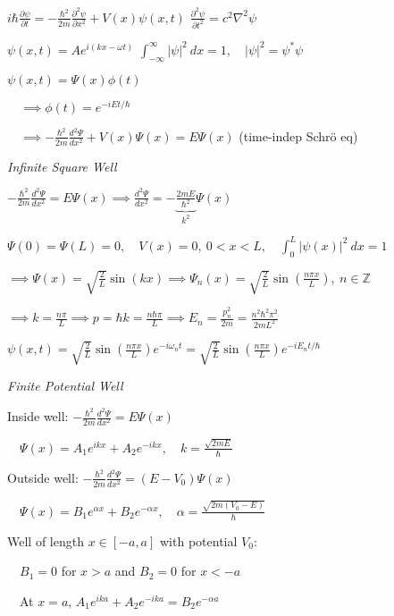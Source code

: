 \documentclass[twocolumn]{article}
\begin{document}
$i\hbar \frac{\partial \psi}{\partial t} = -\frac{\hbar^2}{2m} \frac{\partial^2 \psi}{\partial x^2} + V(x) \psi(x, t)$ \hfill $\frac{\partial^2 \psi}{\partial t^2} = c^2 \nabla^2 \psi$

$\psi(x, t) = A e^{i(kx-\omega t)}$ \hfill $\int_{-\infty}^\infty |\psi|^2\ dx = 1,\quad |\psi|^2 = \psi^* \psi$

$\psi(x, t) = \Psi(x) \phi(t)$

$\quad \implies \phi(t) = e^{-iEt/\hbar}$

$\quad \implies -\frac{\hbar^2}{2m} \frac{d^2 \Psi}{dx^2} + V(x) \Psi(x) = E \Psi(x)$ \hfill (time-indep Schr\"o eq)

\vspace{-.5em}
\dotfill

\textit{Infinite Square Well}

$-\frac{\hbar^2}{2m} \frac{d^2 \Psi}{dx^2} = E \Psi(x) \implies \frac{d^2 \Psi}{dx^2} = - \underbrace{\frac{2mE}{\hbar^2}}_{k^2} \Psi(x)$

$\Psi(0) = \Psi(L) = 0,\quad V(x) = 0,\ 0 < x < L,\quad \int_0^L |\psi(x)|^2\ dx = 1$

$\implies \Psi(x) = \sqrt{\frac{2}{L}} \sin(kx) \implies \Psi_n(x) = \sqrt{\frac{2}{L}} \sin\left( \frac{n\pi x}{L} \right),\ n \in \mathbb{Z}$

$\implies k = \frac{n\pi}{L} \implies p = \hbar k = \frac{n\hbar \pi}{L} \implies E_n = \frac{p_n^2}{2m} = \frac{n^2 \hbar^2 \pi^2}{2mL^2}$

$\psi(x,t) = \sqrt{\frac{2}{L}} \sin \left( \frac{n\pi x}{L} \right) e^{-i\omega_n t} = \sqrt{\frac{2}{L}} \sin \left( \frac{n\pi x}{L} \right) e^{-iE_n t / \hbar}$

\dotfill

\textit{Finite Potential Well}

Inside well: $-\frac{\hbar^2}{2m} \frac{d^2 \Psi}{dx^2} = E \Psi(x)$

$\quad \Psi(x) = A_1 e^{ikx} + A_2 e^{-ikx},\quad k = \frac{\sqrt{2mE}}{\hbar}$

Outside well: $-\frac{\hbar^2}{2m} \frac{d^2 \Psi}{dx^2} = (E-V_0) \Psi(x)$

$\quad \Psi(x) = B_1 e^{\alpha x} + B_2 e^{-\alpha x},\quad \alpha = \frac{\sqrt{2m(V_0 - E)}}{\hbar}$

Well of length $x \in [-a, a]$ with potential $V_0$:

$\quad B_1 = 0$ for $x > a$ and $B_2 = 0$ for $x < -a$

$\quad$At $x=a$, $A_1 e^{ika} + A_2 e^{-ika} = B_2 e^{-\alpha a}$
\end{document}
